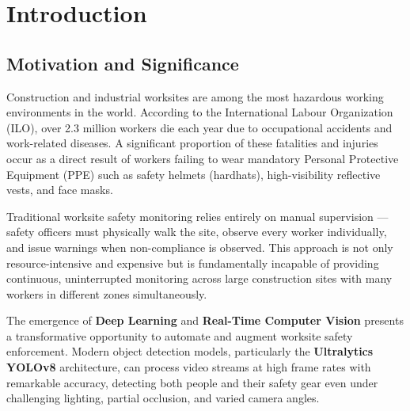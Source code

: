 \documentclass[12pt,a4paper]{report}
\begin{document}
\tableofcontents
\thispagestyle{fancy}
\newpage

\chapter{Introduction}

\section{Motivation and Significance}

Construction and industrial worksites are among the most hazardous working environments in the world. According to the International Labour Organization (ILO), over 2.3 million workers die each year due to occupational accidents and work-related diseases. A significant proportion of these fatalities and injuries occur as a direct result of workers failing to wear mandatory Personal Protective Equipment (PPE) such as safety helmets (hardhats), high-visibility reflective vests, and face masks.

Traditional worksite safety monitoring relies entirely on manual supervision — safety officers must physically walk the site, observe every worker individually, and issue warnings when non-compliance is observed. This approach is not only resource-intensive and expensive but is fundamentally incapable of providing continuous, uninterrupted monitoring across large construction sites with many workers in different zones simultaneously.

The emergence of \textbf{Deep Learning} and \textbf{Real-Time Computer Vision} presents a transformative opportunity to automate and augment worksite safety enforcement. Modern object detection models, particularly the \textbf{Ultralytics YOLOv8} architecture, can process video streams at high frame rates with remarkable accuracy, detecting both people and their safety gear even under challenging lighting, partial occlusion, and varied camera angles.
\end{document}
